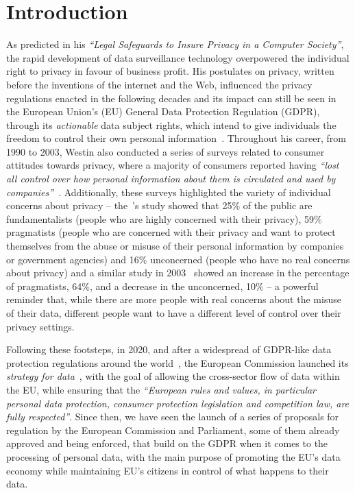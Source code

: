 \chapter{Introduction}
\label{chap:intro}


As \cite{westin_legal_1967} predicted in his \textit{``Legal Safeguards to Insure Privacy in a Computer Society''}, the rapid development of data surveillance technology overpowered the individual right to privacy in favour of business profit.
His postulates on privacy, written before the inventions of the internet and the Web, influenced the privacy regulations enacted in the following decades and its impact can still be seen in the European Union's (EU) General Data Protection Regulation (GDPR), through its \textit{actionable} data subject rights, which intend to give individuals the freedom to control their own personal information~\citep{westin_privacy_1967}.
Throughout his career, from 1990 to 2003, Westin also conducted a series of surveys related to consumer attitudes towards privacy, where a majority of consumers reported having \textit{``lost all control over how personal information about them is circulated and used by companies''}~\citep{kumaraguru_privacy_2005}.
Additionally, these surveys highlighted the variety of individual concerns about privacy -- the~\citeyear{westin_equifax-harris_1996}'s study showed that 25\% of the public are fundamentalists (people who are highly concerned with their privacy), 59\% pragmatists (people who are concerned with their privacy and want to protect themselves from the abuse or misuse of their personal information by companies or government agencies) and 16\% unconcerned (people who have no real concerns about privacy) and a similar study in 2003~\citep{taylor_most_2003} showed an increase in the percentage of pragmatists, 64\%, and a decrease in the unconcerned, 10\% -- a powerful reminder that, while there are more people with real concerns about the misuse of their data, different people want to have a different level of control over their privacy settings.

Following these footsteps, in 2020, and after a widespread of GDPR-like data protection regulations around the world~\citep{bradford_brussels_2019}, the European Commission launched its \textit{strategy for data}~\citep{european_commission_communication_2020}, with the goal of allowing the cross-sector flow of data within the EU, while ensuring that the \textit{``European rules and values, in particular personal data protection, consumer protection legislation and competition law, are fully respected''}.
Since then, we have seen the launch of a series of proposals for regulation by the European Commission and Parliament, some of them already approved and being enforced, that build on the GDPR when it comes to the processing of personal data, with the main purpose of promoting the EU's data economy while maintaining EU's citizens in control of what happens to their data.

